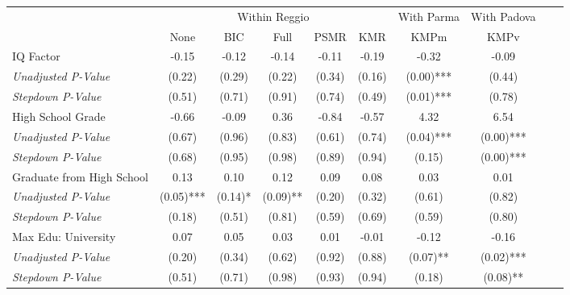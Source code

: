 \begin{tabular}{l c c c c c c c c c}
\toprule
& \multicolumn{5}{c}{Within Reggio} & With Parma & With Padova \\\cmidrule(lr){2-6} \cmidrule(lr){7} \cmidrule(lr){8}
 & None & BIC & Full & PSMR & KMR & KMPm & KMPv \\
\midrule
IQ Factor & -0.15 & -0.12 & -0.14 & -0.11 & -0.19 & -0.32 & -0.09 \\
\quad \textit{Unadjusted P-Value} & (0.22) & (0.29) & (0.22) & (0.34) & (0.16) & (0.00)*** & (0.44) \\
\quad \textit{Stepdown P-Value} & (0.51) & (0.71) & (0.91) & (0.74) & (0.49) & (0.01)*** & (0.78) \\
High School Grade & -0.66 & -0.09 & 0.36 & -0.84 & -0.57 & 4.32 & 6.54 \\
\quad \textit{Unadjusted P-Value} & (0.67) & (0.96) & (0.83) & (0.61) & (0.74) & (0.04)*** & (0.00)*** \\
\quad \textit{Stepdown P-Value} & (0.68) & (0.95) & (0.98) & (0.89) & (0.94) & (0.15) & (0.00)*** \\
Graduate from High School & 0.13 & 0.10 & 0.12 & 0.09 & 0.08 & 0.03 & 0.01 \\
\quad \textit{Unadjusted P-Value} & (0.05)*** & (0.14)* & (0.09)** & (0.20) & (0.32) & (0.61) & (0.82) \\
\quad \textit{Stepdown P-Value} & (0.18) & (0.51) & (0.81) & (0.59) & (0.69) & (0.59) & (0.80) \\
Max Edu: University & 0.07 & 0.05 & 0.03 & 0.01 & -0.01 & -0.12 & -0.16 \\
\quad \textit{Unadjusted P-Value} & (0.20) & (0.34) & (0.62) & (0.92) & (0.88) & (0.07)** & (0.02)*** \\
\quad \textit{Stepdown P-Value} & (0.51) & (0.71) & (0.98) & (0.93) & (0.94) & (0.18) & (0.08)** \\
\bottomrule
\end{tabular}
